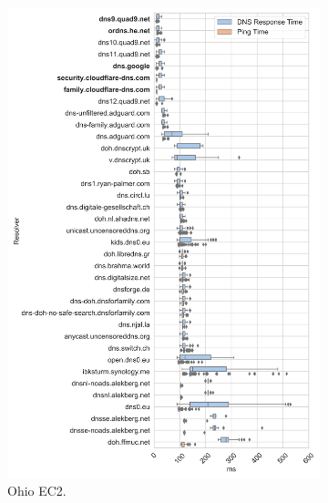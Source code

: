 \begin{figure}[t!]
\begin{subfigure}[b]{0.4\textwidth}
\includegraphics[width=\textwidth]{figures/ohio_eur.png}
\caption{Ohio EC2.}
\label{fig:subfigb}
\end{subfigure}
%
\hfill \\
\begin{subfigure}[b]{0.4\textwidth}

\end{subfigure}
\end{figure}

